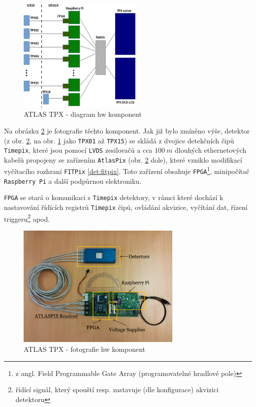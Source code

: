 \begin{figure}[t]
	\begin{center}
		\includegraphics[width=6cm]{figures/tpx_hw_diagram.png}
		\caption{ATLAS TPX - diagram hw komponent}
		\label{fig:tpx_hw_diagram}
	\end{center}
\end{figure}

Na obrázku \ref{fig:tpx_hw_foto} je fotografie  těchto komponent. Jak již bylo zmíněno výše, detektor (z obr. \ref{fig:tpx_hw_foto}, na obr. \ref{fig:tpx_hw_diagram} jako \texttt{TPX01} až \texttt{TPX15}) se skládá z dvojice detekčních čipů \texttt{Timepix}, které jsou pomocí \texttt{LVDS} zesilovačů a cca $100~m$ dlouhých ethernetových kabelů propojeny se zařízením \texttt{AtlasPix} (obr. \ref{fig:tpx_hw_foto} dole), které vzniklo modifikací vyčítacího rozhraní \texttt{FITPix} \ref{det:fitpix}. Toto zařízení obsahuje \texttt{FPGA}\footnote{z angl. Field Programmable Gate Array (programovatelné hradlové pole)}, minipočítač \texttt{Raspberry Pi} a další podpůrnou elektroniku. 

\texttt{FPGA} se stará o komunikaci s \texttt{Timepix} detektory, v rámci které dochází k nastavování řídících registrů \texttt{Timepix} čipů, ovládání akvizice, vyčítání dat, řízení triggeru\footnote{řídící signál, který spouští resp. zastavuje (dle konfigurace) akvizici detektoru} apod.

\begin{figure}[t]
	\begin{center}
		\includegraphics[width=8cm]{figures/tpx_hw_foto.png}
		\caption{ATLAS TPX - fotografie hw komponent}
		\label{fig:tpx_hw_foto}
	\end{center}
\end{figure}

